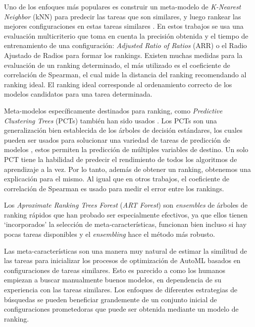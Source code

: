 Uno de los enfoques más populares es construir un meta-modelo de \textit{K-Nearest Neighbor} (kNN) para predecir las tareas que son similares, y luego rankear las mejores configuraciones en estas tareas similares \cite{santos2004selection, bradzil2003ranking}. En estos trabajos se usa una evaluación multicriterio que toma en cuenta la precisión obtenida y el tiempo de entrenamiento de una configuración: \textit{Adjusted Ratio of Ratios} (ARR) o el Radio Ajustado de Radios para formar los rankings. Existen muchas medidas para la evaluación de un ranking determinado, el más utilizado es el coeficiente de correlación de Spearman, el cual mide la distancia del ranking recomendando al ranking ideal. El ranking ideal corresponde al ordenamiento correcto de los modelos candidatos para una tarea determinada.
 
Meta-modelos específicamente destinados para ranking, como \textit{Predictive Clustering Trees} (PCTs) también han sido usados \cite{todorovski2002ranking}. Los PCTs son una generalización bien establecida de los árboles de decisión estándares, los cuales pueden ser usados para solucionar una variedad de tareas de predicción de modelos \cite{tomaz2020oblique}, estos permiten la predicción de múltiples variables de destino. Un solo PCT tiene la habilidad de predecir el rendimiento de todos los algoritmos de aprendizaje a la vez. Por lo tanto, además de obtener un ranking, obtenemos una explicación para el mismo. Al igual que en otros trabajos, el coeficiente de correlación de Spearman es usado para medir el error entre los rankings.
 
Los \textit{Aproximate Ranking Trees Forest} (\textit{ART Forest}) \cite{sun2013pairwise} son \textit{ensembles} de árboles de ranking rápidos que han probado ser especialmente efectivos, ya que ellos tienen `incorporados' la selección de meta-características, funcionan bien incluso si hay pocas tareas disponibles y el \textit{ensembling} hace el método más robusto.

Las meta-características son una manera muy natural de estimar la similitud de las tareas para inicializar los procesos de optimización de AutoML basados en configuraciones de tareas similares. Esto es parecido a como los humanos empiezan a buscar manualmente buenos modelos, en dependencia de su experiencia con las tareas similares. Los enfoques de diferentes estrategias de búsquedas se pueden beneficiar grandemente de un conjunto inicial de configuraciones prometedoras que puede ser obtenida mediante un modelo de ranking.

